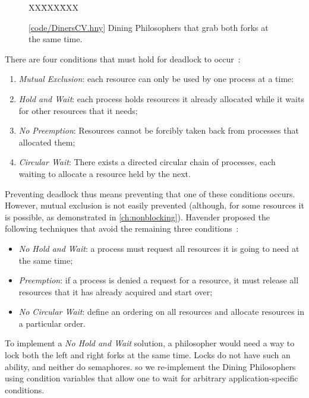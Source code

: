 \documentclass{report}
\newcommand{\harmonysource}[1]{
\begin{tabbing}
XX\=XXX\=XXX\kill
    
\end{tabbing}
}
\newcommand{\harmonylink}[1]{%
[\href{https://www.cs.cornell.edu/home/rvr/harmony/#1}{\underline{#1}}]%
}
\newenvironment{code}{
\tcolorbox
}{
\endtcolorbox
}
\begin{document}
\begin{figure}
\begin{code}
\harmonysource{DinersCV}
\end{code}
\caption{\harmonylink{code/DinersCV.hny} Dining Philosophers that grab both forks at the same time.}
\label{fig:dinerscv}
\end{figure}

\noindent
There are four conditions that must hold for deadlock to occur~\cite{CES71}:
\begin{enumerate}
\item \emph{Mutual Exclusion}: each resource can only be used by one process at a time:
\item \emph{Hold and Wait}: each process holds resources it already allocated while it
waits for other resources that it needs;
\item \emph{No Preemption}: Resources cannot be forcibly taken back from processes that
allocated them;
\item \emph{Circular Wait}: There exists a directed circular chain of processes, each waiting
to allocate a resource held by the next.
\end{enumerate}

Preventing deadlock thus means preventing that one of these conditions occurs.
However, mutual exclusion is not easily prevented (although, for some resources it is
possible, as demonstrated in \autoref{ch:nonblocking}).
Havender proposed the following techniques that avoid the remaining
three conditions~\cite{Havender68}:

\begin{itemize}
\item \emph{No Hold and Wait}: a process must request all resources it is going to
need at the same time;
\item \emph{Preemption}: if a process is denied a request for a resource, it must
release all resources that it has already acquired and start over;
\item \emph{No Circular Wait}: define an ordering on all resources and allocate
resources in a particular order.
\end{itemize}

To implement a \emph{No Hold and Wait} solution, a philosopher would need a
way to lock both the left and right forks at the same time.  Locks do not
have such an ability, and neither do semaphores. so we re-implement the
Dining Philosophers using condition variables that allow one to wait for
arbitrary application-specific conditions.
\end{document}
